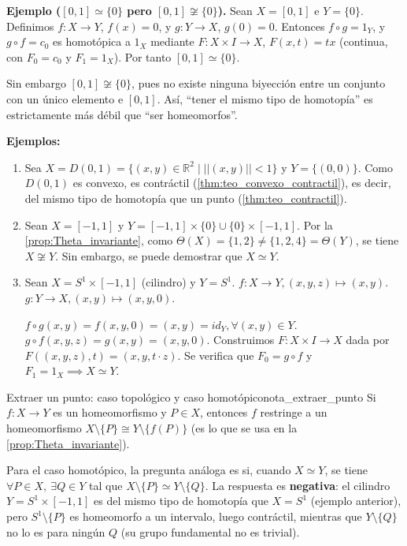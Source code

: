 \textbf{Ejemplo ($[0,1] \simeq \{0\}$ pero $[0,1] \not\cong \{0\}$).}
Sean $X = [0,1]$ e $Y = \{0\}$. Definimos $f \colon X \to Y$, $f(x) = 0$, y $g \colon Y \to X$, $g(0) = 0$. Entonces $f \circ g = 1_Y$, y $g \circ f = c_0$ es homotópica a $1_X$ mediante $F \colon X \times I \to X$, $F(x,t) = tx$ (continua, con $F_0 = c_0$ y $F_1 = 1_X$). Por tanto $[0,1] \simeq \{0\}$.

Sin embargo $[0,1] \not\cong \{0\}$, pues no existe ninguna biyección entre un conjunto con un único elemento e $[0,1]$. Así, ``tener el mismo tipo de homotopía'' es estrictamente más débil que ``ser homeomorfos''.

\textbf{Ejemplos:}
\begin{enumerate}
    \item Sea $X = D(0,1) = \{(x,y) \in \mathbb{R}^2 \mid ||(x,y)|| < 1\}$ y $Y = \{(0,0)\}$.
    Como $D(0,1)$ es convexo, es contráctil (\cref{thm:teo_convexo_contractil}), es decir, del mismo tipo de homotopía que un punto (\cref{thm:teo_contractil}).
    
    \item Sean $X = [-1,1]$ y $Y = [-1,1] \times \{0\} \cup \{0\} \times [-1,1]$. 
    Por la \cref{prop:Theta_invariante}, como $\Theta(X) = \{1,2\} \neq \{1,2,4\} = \Theta(Y)$, se tiene $X \not\cong Y$. Sin embargo, se puede demostrar que $X \simeq Y$.
    
    \item Sean $X = S^1 \times [-1,1]$ (cilindro) y $Y = S^1$.
    $f \colon X \to Y, (x,y,z) \mapsto (x,y)$.
    $g \colon Y \to X, (x,y) \mapsto (x,y,0)$.
    
    $f \circ g(x,y) = f(x,y,0) = (x,y) = id_Y, \forall (x,y) \in Y$.
    $g \circ f(x,y,z) = g(x,y) = (x,y,0)$. 
    Construimos $F \colon X \times I \to X$ dada por $F((x,y,z), t) = (x,y, t \cdot z)$. Se verifica que $F_0 = g \circ f$ y $F_1 = 1_X \implies X \simeq Y$.
\end{enumerate}

\begin{nota}{Extraer un punto: caso topológico y caso homotópico}{nota_extraer_punto}
Si $f \colon X \to Y$ es un homeomorfismo y $P \in X$, entonces $f$ restringe a un homeomorfismo $X \setminus \{P\} \cong Y \setminus \{f(P)\}$ (es lo que se usa en la \cref{prop:Theta_invariante}).

Para el caso homotópico, la pregunta análoga es si, cuando $X \simeq Y$, se tiene $\forall P \in X,\ \exists Q \in Y$ tal que $X \setminus \{P\} \simeq Y \setminus \{Q\}$. La respuesta es \textbf{negativa}: el cilindro $Y = S^1 \times [-1,1]$ es del mismo tipo de homotopía que $X = S^1$ (ejemplo anterior), pero $S^1 \setminus \{P\}$ es homeomorfo a un intervalo, luego contráctil, mientras que $Y \setminus \{Q\}$ no lo es para ningún $Q$ (su grupo fundamental no es trivial).
\end{nota}


